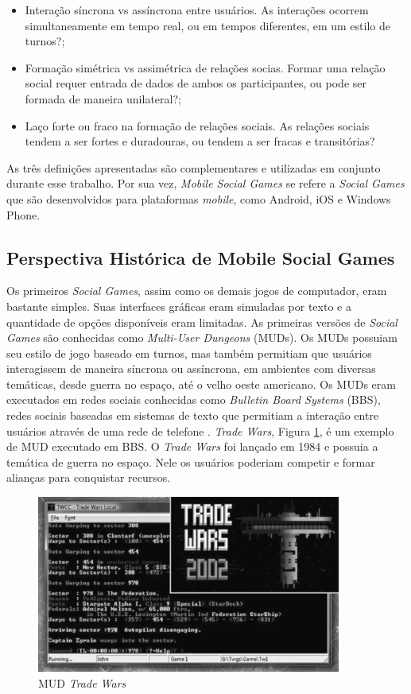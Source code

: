 \begin{itemize}
  \item Interação síncrona vs assíncrona entre usuários. As interações ocorrem simultaneamente em tempo real, ou em tempos diferentes, em um estilo de turnos?;
  \item Formação simétrica vs assimétrica de relações socias. Formar uma relação social requer entrada de dados de ambos os participantes, ou pode ser formada de maneira unilateral?;
  \item Laço forte ou fraco na formação de relações sociais. As relações sociais tendem a ser fortes e duradouras, ou tendem a ser fracas e transitórias?
\end{itemize}

As três definições apresentadas são complementares e utilizadas em conjunto durante esse trabalho.
Por sua vez, \textit{Mobile Social Games} se refere a \textit{Social Games} que são desenvolvidos para plataformas \textit{mobile}, como Android, iOS e Windows Phone.

  \subsection{Perspectiva Histórica de Mobile Social Games}

Os primeiros \textit{Social Games}, assim como os demais jogos de computador, eram bastante simples. Suas interfaces gráficas eram simuladas por texto e a quantidade de opções disponíveis eram limitadas. As primeiras versões de \textit{Social Games} são conhecidas como \textit{Multi-User Dungeons} (MUDs)\cite{edward1997}. Os MUDs possuiam seu estilo de jogo baseado em turnos, mas também permitiam que usuários interagissem de maneira síncrona ou assíncrona, em ambientes com diversas temáticas, desde guerra no espaço, até o velho oeste americano. Os MUDs eram executados em redes sociais conhecidas como \textit{Bulletin Board Systems} (BBS), redes sociais baseadas em sistemas de texto que permitiam a interação entre usuários através de uma rede de telefone \cite{fields2014}. \textit{Trade Wars}, Figura \ref{figura:tradeWars}, é um exemplo de MUD executado em BBS. O \textit{Trade Wars} foi lançado em 1984 e possuia a temática de guerra no espaço. Nele os usuários poderiam competir e formar alianças para conquistar recursos.

\begin{figure}[h]
  \centering
  \includegraphics[width=10cm]{figuras/trade_wars.png}
  \caption{MUD \textit{Trade Wars} \cite{fields2014}}
  \label{figura:tradeWars}
\end{figure}

